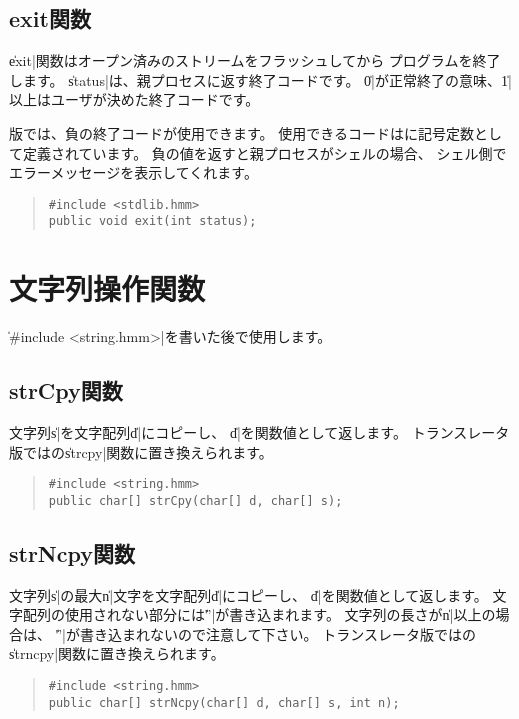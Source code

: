 \subsection{exit関数}

\|exit|関数はオープン済みのストリームをフラッシュしてから
プログラムを終了します。
\|status|は、親プロセスに返す終了コードです。
\|0|が正常終了の意味、\|1|以上はユーザが決めた終了コードです。

{\tacos}版では、負の終了コードが使用できます。
使用できるコードはに記号定数として定義されています。
負の値を返すと親プロセスがシェルの場合、
シェル側でエラーメッセージを表示してくれます。

\begin{quote}
\begin{verbatim}
#include <stdlib.hmm>
public void exit(int status);
\end{verbatim}
\end{quote}

\section{文字列操作関数}

\|#include <string.hmm>|を書いた後で使用します。

\subsection{strCpy関数}

文字列\|s|を文字配列\|d|にコピーし、
\|d|を関数値として返します。
トランスレータ版では\cl の\|strcpy|関数に置き換えられます。

\begin{quote}
\begin{verbatim}
#include <string.hmm>
public char[] strCpy(char[] d, char[] s);
\end{verbatim}
\end{quote}

\subsection{strNcpy関数}

文字列\|s|の最大\|n|文字を文字配列\|d|にコピーし、
\|d|を関数値として返します。
文字配列の使用されない部分には\|'\0'|が書き込まれます。
文字列の長さが\|n|以上の場合は、
\|'\0'|が書き込まれないので注意して下さい。
トランスレータ版では\cl の\|strncpy|関数に置き換えられます。

\begin{quote}
\begin{verbatim}
#include <string.hmm>
public char[] strNcpy(char[] d, char[] s, int n);
\end{verbatim}
\end{quote}

